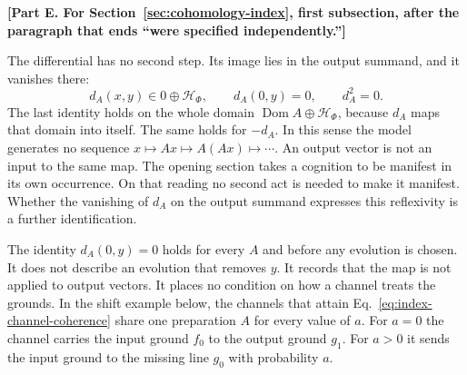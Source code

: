 \par\medskip\noindent\textbf{[Part E. For Section~\ref{sec:cohomology-index}, first subsection, after the paragraph that ends ``were specified independently.'']}\par\smallskip

The differential has no second step. Its image lies in the output summand, and it vanishes there:
\begin{equation}
 d_A(x,y)\in0\oplus\mathcal H_\Phi,\qquad d_A(0,y)=0,\qquad d_A^2=0 .
 \label{eq:index-no-second-step}
\end{equation}
The last identity holds on the whole domain $\operatorname{Dom}A\oplus\mathcal H_\Phi$, because $d_A$ maps that domain into itself. The same holds for $-d_A$. In this sense the model generates no sequence $x\mapsto Ax\mapsto A(Ax)\mapsto\cdots$. An output vector is not an input to the same map. The opening section takes a cognition to be manifest in its own occurrence. On that reading no second act is needed to make it manifest. Whether the vanishing of $d_A$ on the output summand expresses this reflexivity is a further identification.

The identity $d_A(0,y)=0$ holds for every $A$ and before any evolution is chosen. It does not describe an evolution that removes $y$. It records that the map is not applied to output vectors. It places no condition on how a channel treats the grounds. In the shift example below, the channels that attain Eq.~\eqref{eq:index-channel-coherence} share one preparation $A$ for every value of $a$. For $a=0$ the channel carries the input ground $f_0$ to the output ground $g_1$. For $a>0$ it sends the input ground to the missing line $g_0$ with probability $a$.

